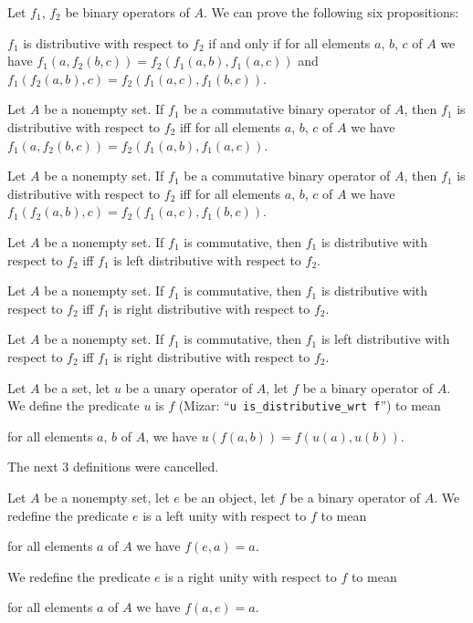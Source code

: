 \documentclass{article}
\begin{document}
Let $f_{1}$, $f_{2}$ be binary operators of $A$. We can prove the
following six propositions:
\begin{thm}
\item\label{binop1:11} $f_{1}$ is distributive with respect to $f_{2}$
  if and only if for all elements $a$, $b$, $c$ of $A$ we have
  $f_{1}(a,f_{2}(b,c))=f_{2}(f_{1}(a,b),f_{1}(a,c))$ and
  $f_{1}(f_{2}(a,b),c)=f_{2}(f_{1}(a,c),f_{1}(b,c))$.
\item\label{binop1:12} Let $A$ be a nonempty set. If $f_{1}$ be a
  commutative binary operator of $A$,
  then $f_{1}$ is distributive with respect to $f_{2}$ iff for all
  elements $a$, $b$, $c$ of $A$ we have $f_{1}(a,f_{2}(b,c))=f_{2}(f_{1}(a,b),f_{1}(a,c))$.
\item\label{binop1:13} Let $A$ be a nonempty set. If $f_{1}$ be a
  commutative binary operator of $A$,
  then $f_{1}$ is distributive with respect to $f_{2}$ iff for all
  elements $a$, $b$, $c$ of $A$ we have $f_{1}(f_{2}(a,b),c)=f_{2}(f_{1}(a,c),f_{1}(b,c))$.
\item\label{binop1:14} Let $A$ be a nonempty set. If $f_{1}$ is
  commutative, then $f_{1}$ is distributive with respect to $f_{2}$ iff
  $f_{1}$ is left distributive with respect to $f_{2}$. 
\item\label{binop1:15} Let $A$ be a nonempty set. If $f_{1}$ is
  commutative, then $f_{1}$ is distributive with respect to $f_{2}$ iff
  $f_{1}$ is right distributive with respect to $f_{2}$.
\item\label{binop1:16} Let $A$ be a nonempty set. If $f_{1}$ is
  commutative, then $f_{1}$ is left distributive with respect to $f_{2}$ iff
  $f_{1}$ is right distributive with respect to $f_{2}$.
\end{thm}

\begin{definition}
Let $A$ be a set, let $u$ be a unary operator of $A$, let $f$ be a
binary operator of $A$. We define the predicate
$u$ is  $f$ (Mizar: ``\verb#u is_distributive_wrt f#'')
to mean
\begin{defn}
\item for all elements $a$, $b$ of $A$, we have $u(f(a,b))=f(u(a),u(b))$.\addtocounter{defni}{3}
\end{defn}
\end{definition}

The next 3 definitions were cancelled.

\begin{definition}
Let $A$ be a nonempty set, let $e$ be an object, let $f$ be a binary
operator of $A$.
We redefine the predicate $e$ is a left unity with respect to $f$ to mean
\begin{defn}
\item for all elements $a$ of $A$ we have $f(e,a)=a$.
\end{defn}
We redefine the predicate $e$ is a right unity with respect to $f$ to
mean
\begin{defn}
\item\label{binop1:def17} for all elements $a$ of $A$ we have $f(a,e)=a$.
\end{defn}
\end{definition}
\end{document}
